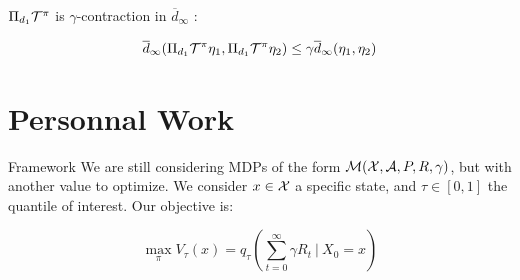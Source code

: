 \documentclass[10pt]{beamer}
\begin{document}
\begin{frame}
    \begin{proposition}
        $\Pi_{d_1}\mathcal{T}^\pi$ is $\gamma$-contraction in $\overline{d}_\infty$ :
    
        \[ \overline{d}_\infty(\Pi_{d_1}\mathcal{T}^\pi\eta_1 , \Pi_{d_1}\mathcal{T}^\pi\eta_2) \leq \gamma \overline{d}_\infty(\eta_1, \eta_2)\]
    \end{proposition}
\end{frame}

























\section{Personnal Work}
\begin{frame}{Framework}
    We are still considering MDPs of the form $\mathcal{M}(\mathcal{X},\mathcal{A}, P,R, \gamma)$, but with another value to optimize. We consider $x \in \mathcal{X}$ a specific state, and $\tau \in [0,1]$ the quantile of interest. Our objective is:

\[\max_\pi V_\tau(x) = q_\tau\left(\sum_{t = 0}^{\infty} \gamma R_t \ |\ X_0 = x\right) \]
\end{frame}
\end{document}
